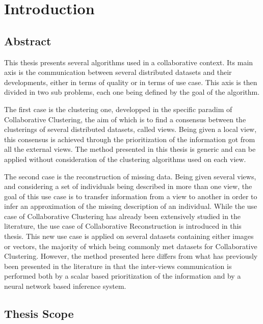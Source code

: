 \chapter{Introduction}

\minitoc{}
\newpage

\section{Abstract}

This thesis presents several algorithms used in a collaborative context. Its main axis is the communication between several distributed datasets and their developments, either in terms of quality or in terms of use case. This axis is then divided in two sub problems, each one being defined by the goal of the algorithm.

The first case is the clustering one, developped in the specific paradim of Collaborative Clustering, the aim of which is to find a consensus between the clusterings of several distributed datasets, called views. Being given a local view, this consensus is achieved through the prioritization of the information got from all the external views. The method presented in this thesis is generic and can be applied without consideration of the clustering algorithms used on each view.

The second case is the reconstruction of missing data. Being given several views, and considering a set of individuals being described in more than one view, the goal of this use case is to transfer information from a view to another in order to infer an approximation of the missing description of an individual. While the use case of Collaborative Clustering has already been extensively studied in the literature, the use case of Collaborative Reconstruction is introduced in this thesis. This new use case is applied on several datasets containing either images or vectors, the majority of which being commonly met datasets for Collaborative Clustering. However, the method presented here differs from what has previously been presented in the literature in that the inter-views communication is performed both by a scalar based prioritization of the information and by a neural network based inference system.

\section{Thesis Scope}

